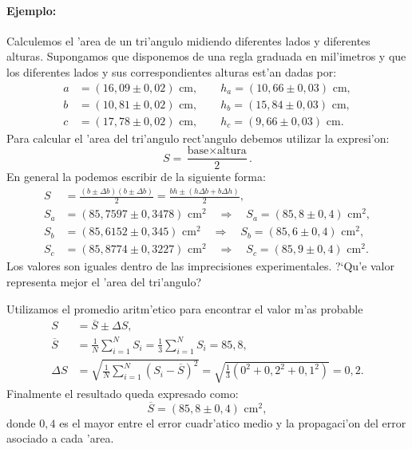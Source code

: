 \documentclass[a4paper]{report}
\begin{document}
\paragraph{Ejemplo:}
Calculemos el 'area de un tri'angulo midiendo diferentes lados y diferentes alturas. Supongamos que disponemos de una regla graduada en mil'imetros y que los diferentes lados y sus correspondientes alturas est'an dadas por: 
\begin{align}
a &= (16,09\pm 0,02)\text{ cm}, \qquad h_a= (10,66\pm 0,03)\text{ cm}, \\
b &= (10,81\pm 0,02)\text{ cm}, \qquad h_b= (15,84\pm 0,03)\text{ cm}, \\
c &= (17,78\pm 0,02)\text{ cm}, \qquad h_c= (9,66\pm 0,03)\text{ cm}.
\end{align}
Para calcular el 'area del tri'angulo rect'angulo debemos utilizar la expresi'on:
\begin{equation}
S=\frac{\text{base}\times\text{altura}}{2}.
\end{equation}
En general la podemos escribir de la siguiente forma:
\begin{align}
S &= \frac{(b\pm\Delta b)(b\pm\Delta b)}{2}=\frac{bh\pm (h\Delta b+b\Delta h)}{2}, \\
S_a &= (85,7597\pm 0,3478)\text{ cm}^2 \quad \Rightarrow\quad S_a= (85,8\pm 0,4)\text{ cm}^2, \\
S_b &= (85,6152\pm 0,345)\text{ cm}^2 \quad \Rightarrow\quad S_b= (85,6\pm 0,4)\text{ cm}^2, \\
S_c &= (85,8774\pm 0,3227)\text{ cm}^2 \quad \Rightarrow\quad S_c= (85,9\pm 0,4)\text{ cm}^2.
\end{align}
Los valores son iguales dentro de las imprecisiones experimentales.
?`Qu'e valor representa mejor el 'area del tri'angulo?

Utilizamos el promedio aritm'etico para encontrar el valor m'as probable
\begin{align}
S &= \overline{S}\pm\Delta S, \\
\overline{S} &=\frac{1}{N}\sum_{i=1}^N S_i=\frac{1}{3}\sum_{i=1}^N S_i=85,8, \\
\Delta S &= \sqrt{\frac{1}{N}\sum_{i=1}^N (S_i-\overline{S})^2}=\sqrt{\frac{1}{3}\left(0^2+0,2^2+0,1^2\right)}=0,2.
\end{align}
Finalmente el resultado queda expresado como:
\begin{equation}
\overline{S}=(85,8\pm 0,4)\text{ cm}^2,
\end{equation}
donde $0,4$ es el mayor entre el error cuadr'atico medio y la propagaci'on del error asociado a cada 'area. 
\end{document}

